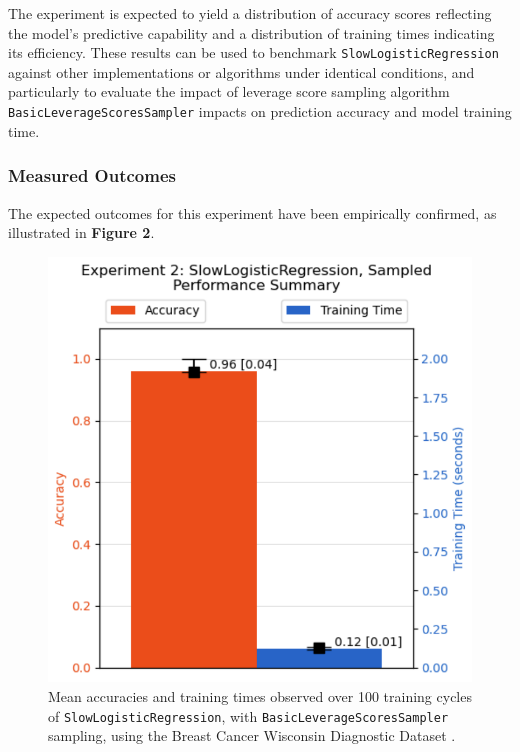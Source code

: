 \documentclass{article}
\theoremstyle{plain}
\theoremstyle{definition}
\theoremstyle{remark}
\begin{document}
The experiment is expected to yield a distribution of accuracy scores reflecting the model's predictive capability and a distribution of training times indicating its efficiency. These results can be used to benchmark \texttt{SlowLogisticRegression} against other implementations or algorithms under identical conditions, and particularly to evaluate the impact of leverage score sampling algorithm \texttt{BasicLeverageScoresSampler} impacts on prediction accuracy and model training time.

\subsubsection{Measured Outcomes}

The expected outcomes for this experiment have been empirically confirmed, as illustrated in \textbf{Figure 2}.

\begin{figure}[ht]
	\vskip 0.2in
	\begin{center}
		\centerline{\includegraphics[width=\columnwidth]{experiment_02}}
		\caption{Mean accuracies and training times observed over 100 training cycles of \texttt{SlowLogisticRegression}, with \texttt{BasicLeverageScoresSampler} sampling, using the Breast Cancer Wisconsin Diagnostic Dataset \cite{breastcancer}.}
		\label{experiment_02}
	\end{center}
	\vskip -0.2in
\end{figure}
\end{document}
